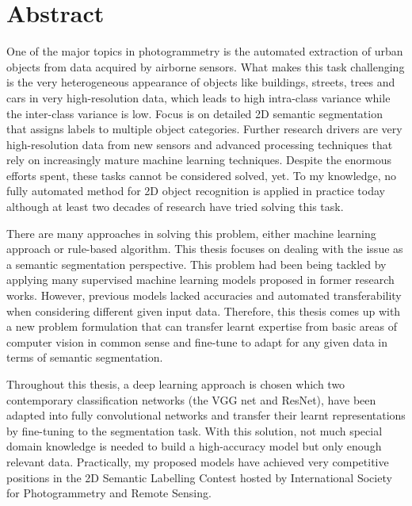 \chapter*{Abstract}
One of the major topics in photogrammetry is the automated extraction of
urban objects from data acquired by airborne sensors. What makes this task
challenging is the very heterogeneous appearance of objects like buildings,
streets, trees and cars in very high-resolution data, which leads to high
intra-class variance while the inter-class variance is low. Focus is on
detailed 2D semantic segmentation that assigns labels to multiple object
categories. Further research drivers are very high-resolution data from new
sensors and advanced processing techniques that rely on increasingly mature
machine learning techniques. Despite the enormous efforts spent, these tasks
cannot be considered solved, yet. To my knowledge, no fully automated method
for 2D object recognition is applied in practice today although at least two
decades of research have tried solving this task.


There are many approaches in solving this problem, either machine learning
approach or rule-based algorithm. This thesis focuses on dealing with the
issue as a semantic segmentation perspective. This problem had been being
tackled by applying many supervised machine learning models proposed in
former research works. However, previous models lacked accuracies and
automated transferability when considering different given input data.
Therefore, this thesis comes up with a new problem formulation that can
transfer learnt expertise from basic areas of computer vision in common
sense and fine-tune to adapt for any given data in terms of semantic
segmentation.


Throughout this thesis, a deep learning approach is chosen which two
contemporary classification networks (the VGG net and ResNet), have been
adapted into fully convolutional networks and transfer their learnt
representations by fine-tuning to the segmentation task. With this solution,
not much special domain knowledge is needed to build a high-accuracy model
but only enough relevant data. Practically, my proposed models have achieved
very competitive positions in the 2D Semantic Labelling Contest hosted by
International Society for Photogrammetry and Remote Sensing.
